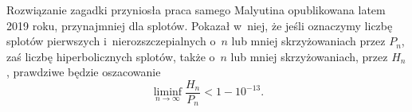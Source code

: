 Rozwiązanie zagadki przyniosła praca samego Malyutina \cite{malyutin19} opublikowana latem 2019 roku, przynajmniej dla splotów.
Pokazał w~niej, że jeśli oznaczymy liczbę splotów pierwszych i~nierozszczepialnych o~$n$ lub mniej skrzyżowaniach przez $P_n$, zaś liczbę hiperbolicznych splotów, także o~$n$ lub mniej skrzyżowaniach, przez $H_n$, prawdziwe będzie oszacowanie
\begin{equation}
    \liminf_{n \to \infty} \frac{H_n}{P_n} < 1 - 10^{-13}.
\end{equation}




